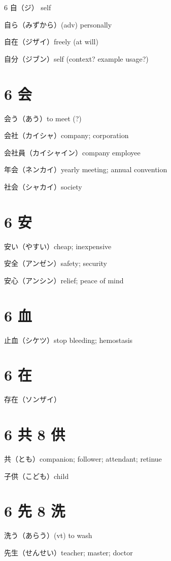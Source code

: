 6 自（ジ） self

自ら（みずから）(adv) personally

自在（ジザイ）freely (at will)

自分（ジブン）self (context? example usage?)

\section{6 会}

会う（あう）to meet (?)

会社（カイシャ）company; corporation

会社員（カイシャイン）company employee

年会（ネンカイ）yearly meeting; annual convention

社会（シャカイ）society

\section{6 安}

安い（やすい）cheap; inexpensive

安全（アンゼン）safety; security

安心（アンシン）relief; peace of mind

\section{6 血}

止血（シケツ）stop bleeding; hemostasis

\section{6 在}

存在（ソンザイ）

\section{6 共 8 供}

共（とも）companion; follower; attendant; retinue

子供（こども）child

\section{6 先 8 洗}

洗う（あらう）(vt) to wash

先生（せんせい）teacher; master; doctor

